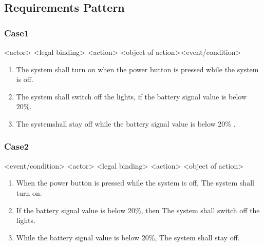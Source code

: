 \subsection{Requirements Pattern}

\subsubsection*{Case1}
	\begin{mybox}
		\centering
		\textcolor{mybule}{<actor>}  \textcolor{mypurple}{<legal binding>} \textcolor{mygreen1}{<action>} \textcolor{mygreen2}{<object of action>}\textcolor{winered}{<event/condition>}
	\end{mybox}
	\begin{enumerate}
		\item \textcolor{mybule}{The system} \textcolor{mypurple}{shall} \textcolor{mygreen1}{turn on} \textcolor{winered}{when the power button is pressed while the system is off}.
		\item \textcolor{mybule}{The system} \textcolor{mypurple}{shall} \textcolor{mygreen1}{switch off} \textcolor{mygreen2}{the lights}, \textcolor{winered}{if the battery signal value is below 20\%}.
		\item \textcolor{mybule}{The system}\textcolor{mypurple}{shall} \textcolor{mygreen1}{stay off} \textcolor{winered}{ while the battery signal value is below 20\% }.
	\end{enumerate}


\subsubsection*{Case2}
	\begin{mybox}
		\centering
		\textcolor{winered}{<event/condition>} \textcolor{mybule}{<actor>} \textcolor{mypurple}{<legal binding>} \textcolor{mygreen1}{<action>} \textcolor{mygreen2}{<object of action>}
	\end{mybox}


	\begin{enumerate}
		\item \textcolor{winered}{When the power button is pressed while the system is off}, \textcolor{mybule}{The system} \textcolor{mypurple}{shall} \textcolor{mygreen1}{turn on}.
		\item \textcolor{winered}{If the battery signal value is below 20\%}, then \textcolor{mybule}{The system} \textcolor{mypurple}{shall}  \textcolor{mygreen1}{switch off} \textcolor{mygreen2}{the lights}.
		\item \textcolor{winered}{While the battery signal value is below 20\%}, \textcolor{mybule}{The system} \textcolor{mypurple}{shall} \textcolor{mygreen1}{stay off}.
	\end{enumerate}





